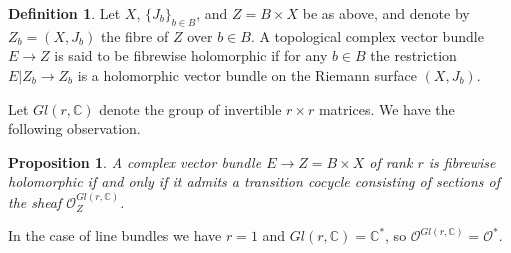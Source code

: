 \documentclass[11pt]{amsart}
\numberwithin{equation}{section}
\newtheorem{proposition}[theorem]{Proposition}
\theoremstyle{definition}
\newtheorem{definition}[theorem]{Definition}
\newcommand\Oscr{\mathscr{O}}
\newcommand\C{\mathbb{C}}
\begin{document}
%
%
\begin{definition}\label{def:FHVB}
Let $X$, $\{J_b\}_{b\in B}$, and $Z=B\times X$ be 
as above, and denote by $Z_b=(X,J_b)$ the fibre of $Z$ over $b\in B$.
A topological complex vector bundle $E \to Z$
is said to be fibrewise holomorphic 
if for any $b\in B$ the restriction $E|Z_b\to Z_b$ is a holomorphic vector
bundle on the Riemann surface $(X,J_b)$.
\end{definition}

Let $Gl(r,\C)$ denote the group of invertible $r\times r$ matrices.
We have the following observation.


\begin{proposition}\label{prop:FHVB}
A complex vector bundle $E\to Z=B\times X$ of rank $r$
is fibrewise holomorphic if and only if it admits a transition cocycle 
consisting of sections of the sheaf $\Oscr_Z^{Gl(r,\C)}$.
\end{proposition}

In the case of line bundles we have $r=1$ and $Gl(r,\C)=\C^*$, 
so $\Oscr^{Gl(r,\C)}=\Oscr^*$.
\end{document}
